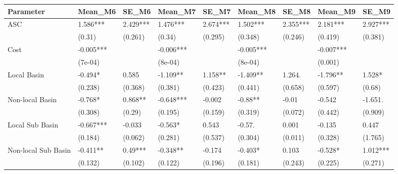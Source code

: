 \begin{table}[ht]
\centering
\begin{tabular}{lllllllll}
  \hline
Parameter & Mean\_M6 & SE\_M6 & Mean\_M7 & SE\_M7 & Mean\_M8 & SE\_M8 & Mean\_M9 & SE\_M9 \\ 
  \hline
ASC & 1.586*** & 2.429*** & 1.476*** & 2.674*** & 1.502*** & 2.355*** & 2.181*** & 2.927*** \\ 
   & (0.31) & (0.261) & (0.34) & (0.295) & (0.348) & (0.246) & (0.419) & (0.381) \\ 
  Cost & -0.005*** &  & -0.006*** &  & -0.005*** &  & -0.007*** &  \\ 
   & (7e-04) &  & (8e-04) &  & (8e-04) &  & (0.001) &  \\ 
  Local Basin & -0.494* & 0.585 & -1.109** & 1.158** & -1.409** & 1.264. & -1.796** & 1.528* \\ 
   & (0.238) & (0.368) & (0.381) & (0.423) & (0.441) & (0.658) & (0.597) & (0.68) \\ 
  Non-local Basin & -0.768* & 0.868** & -0.648*** & -0.002 & -0.88** & -0.01 & -0.542 & -1.651. \\ 
   & (0.308) & (0.29) & (0.195) & (0.159) & (0.319) & (0.072) & (0.442) & (0.909) \\ 
  Local Sub Basin & -0.667*** & -0.033 & -0.563* & 0.543 & -0.57. & 0.001 & -0.135 & 0.447 \\ 
   & (0.184) & (0.062) & (0.281) & (0.537) & (0.304) & (0.011) & (0.328) & (1.765) \\ 
  Non-local Sub Basin & -0.411** & 0.49*** & -0.348** & -0.174 & -0.403* & 0.103 & -0.528* & 1.012*** \\ 
   & (0.132) & (0.102) & (0.122) & (0.196) & (0.181) & (0.243) & (0.225) & (0.271) \\ 
   \hline
\end{tabular}
\end{table}
